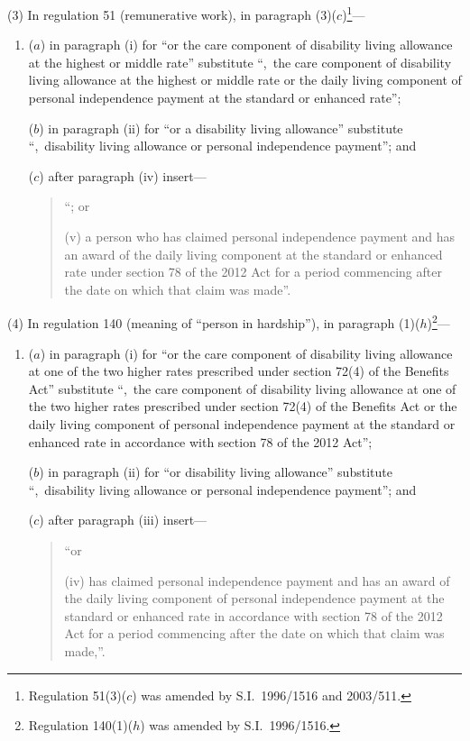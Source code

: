 \documentclass[12pt,a4paper]{article}
\begin{document}
(3) In regulation 51 (remunerative work), in paragraph (3)($c$)\footnote{Regulation 51(3)($c$)  was amended by S.I.~1996/1516 and 2003/511.}—
\begin{enumerate}\item[]
($a$) in paragraph (i)  for “or the care component of disability living allowance at the highest or middle rate” substitute “,~the care component of disability living allowance at the highest or middle rate or the daily living component of personal independence payment at the standard or enhanced rate”;

($b$) in paragraph (ii)  for “or a disability living allowance” substitute “,~disability living allowance or personal independence payment”; and

($c$) after paragraph (iv)  insert—
\begin{quotation}
“; or

(v) a person who has claimed personal independence payment and has an award of the daily living component at the standard or enhanced rate under section 78 of the 2012 Act for a period commencing after the date on which that claim was made”.
\end{quotation}
\end{enumerate}

(4) In regulation 140 (meaning of “person in hardship”), in paragraph (1)($h$)\footnote{Regulation 140(1)($h$)  was amended by S.I.~1996/1516.}—
\begin{enumerate}\item[]
($a$) in paragraph (i)  for “or the care component of disability living allowance at one of the two higher rates prescribed under section 72(4) of the Benefits Act” substitute “,~the care component of disability living allowance at one of the two higher rates prescribed under section 72(4) of the Benefits Act or the daily living component of personal independence payment at the standard or enhanced rate in accordance with section 78 of the 2012 Act”;

($b$) in paragraph (ii)  for “or disability living allowance” substitute “,~disability living allowance or personal independence payment”; and

($c$) after paragraph (iii)  insert—
\begin{quotation}
“or

(iv) has claimed personal independence payment and has an award of the daily living component of personal independence payment at the standard or enhanced rate in accordance with section 78 of the 2012 Act for a period commencing after the date on which that claim was made,”.
\end{quotation}
\end{enumerate}
\end{document}
